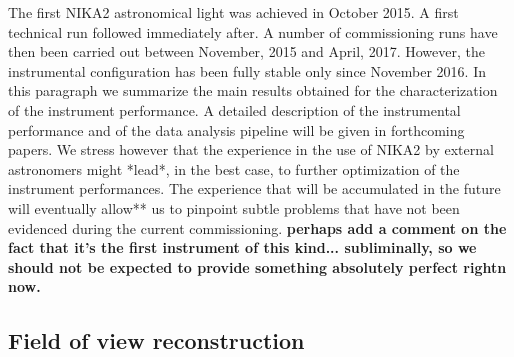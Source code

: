 \documentclass[]{aa} %
\begin{document}
The first NIKA2 astronomical light was achieved in October 2015. A first
technical run followed immediately after. A number of commissioning runs have
then been carried out between November, 2015 and April, 2017.  However, the
instrumental configuration has been fully stable only since November 2016.  In
this paragraph we summarize the main results obtained for the characterization
of the instrument performance. A detailed description of the instrumental
performance and of the data analysis pipeline will be given in forthcoming
papers. We stress however that the experience in the use of NIKA2 by external
astronomers might *lead*, in the best case, to further optimization of the
instrument performances. The experience that will be accumulated in the future
will eventually allow** us to pinpoint subtle problems that have not been
evidenced during the current commissioning. {\bf perhaps add a comment on the
  fact that it's the first instrument of this kind... subliminally, so we should
  not be expected to provide something absolutely perfect rightn now.}

\subsection{Field of view reconstruction}
\end{document}
